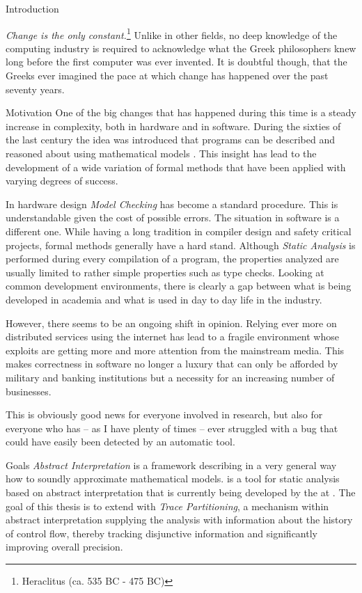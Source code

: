 \begin{chapter}{Introduction}
	\label{chapter:introduction}

	\emph{Change is the only constant.}\footnote{Heraclitus (ca. 535 BC - 475 BC)} Unlike in other fields, no deep knowledge of the computing industry is required to acknowledge what the Greek philosophers knew long before the first computer was ever invented. It is doubtful though, that the Greeks ever imagined the pace at which change has happened over the past seventy years.

	\begin{section}{Motivation}
		One of the big changes that has happened during this time is a steady increase in complexity, both in hardware and in software. During the sixties of the last century the idea was introduced that programs can be described and reasoned about using mathematical models \cite{floyd67, hoare69}. This insight has lead to the development of a wide variation of formal methods that have been applied with varying degrees of success. 
		
		In hardware design \emph{Model Checking} has become a standard procedure. This is understandable given the cost of possible errors. The situation in software is a different one. While having a long tradition in compiler design and safety critical projects, formal methods generally have a hard stand. Although \emph{Static Analysis} is performed during every compilation of a program, the properties analyzed are usually limited to rather simple properties such as type checks. Looking at common development environments, there is clearly a gap between what is being developed in academia and what is used in day to day life in the industry.

		However, there seems to be an ongoing shift in opinion. Relying ever more on distributed services using the internet has lead to a fragile environment whose exploits are getting more and more attention from the mainstream media. This makes correctness in software no longer a luxury that can only be afforded by military and banking institutions but a necessity for an increasing number of businesses.

		This is obviously good news for everyone involved in research, but also for everyone who has -- as I have plenty of times -- ever struggled with a bug that could have easily been detected by an automatic tool. 
	\end{section}

	\begin{section}{Goals}
		\emph{Abstract Interpretation} is a framework describing in a very general way how to soundly approximate mathematical models. \sample is a tool for static analysis based on abstract interpretation that is currently being developed by the \copm at \ethz. The goal of this thesis is to extend \sample with \emph{Trace Partitioning}, a mechanism within abstract interpretation supplying the analysis with information about the history of control flow, thereby tracking disjunctive information and significantly improving overall precision.
	\end{section}


\end{chapter}
